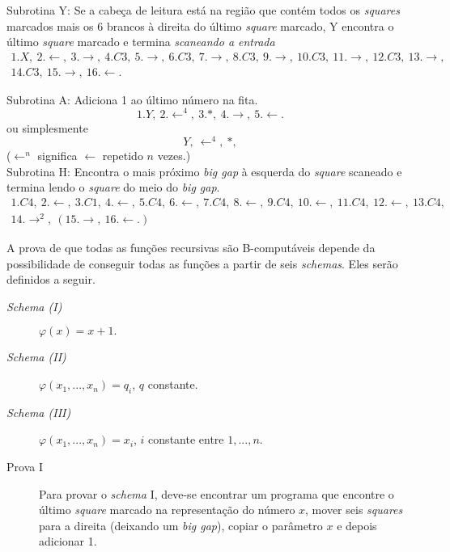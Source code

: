 \documentclass[10pt,letterpaper]{article}
\begin{document}
Subrotina Y: Se a cabe\c{c}a de leitura est\'a na regi\~{a}o que cont\'em todos os \textit{squares} marcados mais os 6 brancos \`a direita do \'ultimo \textit{square} marcado, Y encontra o \'ultimo \textit{square} marcado e termina \textit{scaneando a entrada}
\begin{multline*}
1.X,\ 2.\leftarrow,\ 3.\rightarrow,\ 4.C3,\ 5.\rightarrow,\ 6.C3,\ 7.\rightarrow,\ 8.C3,\ 9.\rightarrow,\ 10.C3,\ 11.\rightarrow,\ 12.C3,\ 13.\rightarrow,\nonumber\\ 14.C3,\ 15.\rightarrow,\ 16.\leftarrow.
\end{multline*}

Subrotina A: Adiciona 1 ao \'ultimo n\'umero na fita.
$$
1.Y,\ 2.\leftarrow^4,\ 3.*,\ 4.\rightarrow,\ 5.\leftarrow.
$$
ou simplesmente
$$
Y,\ \leftarrow^4,\ *,
$$
($\leftarrow^n$ significa $\leftarrow$ repetido $n$ vezes.)\\

Subrotina H: Encontra o mais pr\'oximo \textit{big gap} \`a esquerda do \textit{square} scaneado e termina lendo o \textit{square} do meio do \textit{big gap}.
\begin{multline*}
1.C4,\ 2.\leftarrow,\ 3.C1,\ 4.\leftarrow,\ 5.C4,\ 6.\leftarrow,\ 7.C4,\ 8.\leftarrow,\ 9.C4,\ 10.\leftarrow,\ 11.C4,\ 12.\leftarrow,\ 13.C4,\nonumber\\ 14.\rightarrow^2,\ (15.\rightarrow,\ 16.\leftarrow.)
\end{multline*}

A prova de que todas as fun\c{c}\~{o}es recursivas s\~{a}o B-comput\'aveis depende da possibilidade de conseguir todas as fun\c{c}\~{o}es a partir de seis \textit{schemas}. Eles ser\~{a}o definidos a seguir.

\begin{description}
\item[\textit{Schema (I)}] $\varphi(x) = x + 1.$
\item[\textit{Schema (II)}] $\varphi(x_1, ..., x_n) = q_i$, $q$ constante.
\item[\textit{Schema (III)}] $\varphi(x_1, ..., x_n) = x_i$, $i$ constante entre $1, ..., n$.
\end{description}

\begin{description}
\item[Prova I] Para provar o \textit{schema} I, deve-se encontrar um programa que encontre o \'ultimo \textit{square} marcado na representa\c{c}\~{a}o do n\'umero $x$, mover seis \textit{squares} para a direita (deixando um \textit{big gap}), copiar o par\^ametro $x$ e depois adicionar 1.
\end{description}
\end{document}
